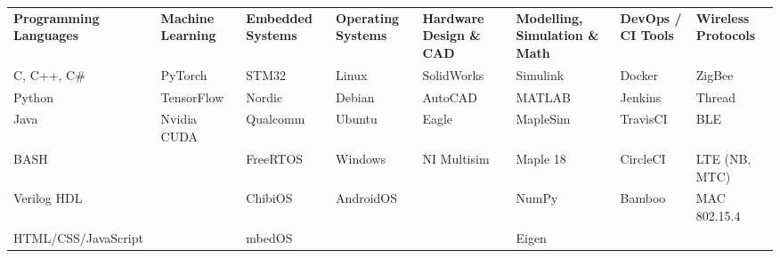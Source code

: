 
\begin{cvparagraph}

\begin{center}
  \begin{tabular}{L L L L L L L L}
  \textbf{Programming Languages} & \textbf{Machine Learning} & \textbf{Embedded Systems} & \textbf{Operating Systems} & \textbf{Hardware Design \& CAD} & \textbf{Modelling, Simulation \& Math} & \textbf{DevOps / CI Tools} & \textbf{Wireless Protocols}   \\
  C, C++, C\#          & PyTorch     & STM32    & Linux     & SolidWorks  & Simulink   & Docker   & ZigBee        \\
  Python               & TensorFlow  & Nordic   & Debian    & AutoCAD     & MATLAB     & Jenkins  & Thread        \\
  Java                 & Nvidia CUDA & Qualcomm & Ubuntu    & Eagle       & MapleSim   & TravisCI & BLE           \\
  BASH                 &             & FreeRTOS & Windows   & NI Multisim & Maple 18   & CircleCI & LTE (NB, MTC) \\
  Verilog HDL          &             & ChibiOS  & AndroidOS &             & NumPy      & Bamboo   & MAC 802.15.4  \\
  HTML/CSS/JavaScript  &             & mbedOS   &           &             & Eigen      &          &               \\
  \end{tabular}
\end{center}


\end{cvparagraph}
